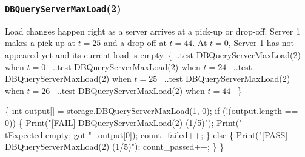 \documentclass{article}
\def\nwendcode{\endtrivlist \endgroup}
\let\nwdocspar=\par
\begin{document}
\subsubsection{{\tt{}DBQueryServerMaxLoad}(2)}
Load changes happen right as a server arrives at a pick-up or drop-off.
Server 1 makes a pick-up at $t=25$ and a drop-off at $t=44$. At $t=0$, Server 1
has not appeared yet and its current load is empty.
\nwenddocs{}\endmoddef{}
\{
  \LA{}..test \code{}DBQueryServerMaxLoad\edoc{}(2) when $t=0$~{\nwtagstyle{}}\RA{}
  \LA{}..test \code{}DBQueryServerMaxLoad\edoc{}(2) when $t=24$~{\nwtagstyle{}}\RA{}
  \LA{}..test \code{}DBQueryServerMaxLoad\edoc{}(2) when $t=25$~{\nwtagstyle{}}\RA{}
  \LA{}..test \code{}DBQueryServerMaxLoad\edoc{}(2) when $t=26$~{\nwtagstyle{}}\RA{}
  \LA{}..test \code{}DBQueryServerMaxLoad\edoc{}(2) when $t=44$~{\nwtagstyle{}}\RA{}
\}
\nwendcode{}\nwdocspar
\nwenddocs{}\endmoddef{}
\{
  int output[] = storage.DBQueryServerMaxLoad(1, 0);
  if (!(output.length == 0)) \{
    Print("[FAIL] DBQueryServerMaxLoad(2) (1/5)");
    Print("\\tExpected empty; got "+output[0]);
    count_failed++;
  \} else \{
    Print("[PASS] DBQueryServerMaxLoad(2) (1/5)");
    count_passed++;
  \}
\}
\nwendcode{}\nwdocspar
\nwenddocs{}\endmoddef{}
\end{document}
